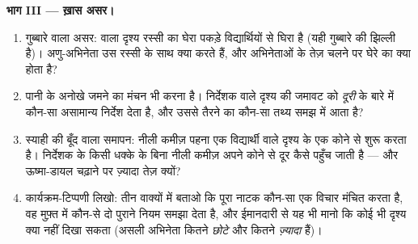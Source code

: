 \begin{problem}
\medskip\noindent\textbf{भाग III --- ख़ास असर।}
\begin{enumerate}[resume]
  \item गुब्बारे वाला असर:  वाला दृश्य रस्सी का घेरा पकड़े
        विद्यार्थियों से घिरा है (यही गुब्बारे की झिल्ली है)।
        अणु-अभिनेता उस रस्सी के साथ क्या करते हैं, और अभिनेताओं के
        तेज़ चलने पर घेरे का क्या होता है?
  \item पानी के अनोखे जमने का मंचन भी करना है। निर्देशक  वाले
        दृश्य की जमावट को \emph{दूरी} के बारे में कौन-सा असामान्य
        निर्देश देता है, और उससे तैरने का कौन-सा तथ्य समझ में आता
        है?
  \item स्याही की बूँद वाला समापन: नीली कमीज़ पहना एक विद्यार्थी
        \emph{} वाले दृश्य के एक कोने से शुरू करता है। निर्देशक
        के किसी धक्के के बिना नीली कमीज़ अपने कोने से दूर कैसे पहुँच
        जाती है --- और ऊष्मा-डायल चढ़ाने पर ज़्यादा तेज़ क्यों?
  \item कार्यक्रम-टिप्पणी लिखो: तीन वाक्यों में बताओ कि पूरा नाटक
        कौन-सा एक विचार मंचित करता है, वह मुफ़्त में कौन-से दो पुराने
        नियम समझा देता है, और ईमानदारी से यह भी मानो कि कोई भी दृश्य
        क्या नहीं दिखा सकता (असली अभिनेता कितने \emph{छोटे} और
        कितने \emph{ज़्यादा} हैं)।
\end{enumerate}
\end{problem}
